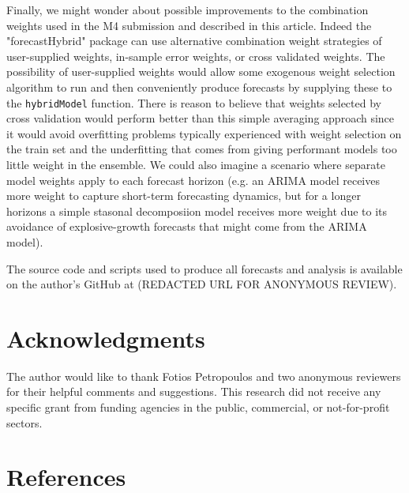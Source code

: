 \documentclass[11pt,3p,review,authoryear]{elsarticle}
\begin{document}
Finally, we might wonder about possible improvements to the combination weights used in the M4 submission and described in this article. Indeed the "forecastHybrid" package can use alternative combination weight strategies of user-supplied weights, in-sample error weights, or cross validated weights. The possibility of user-supplied weights would allow some exogenous weight selection algorithm to run and then conveniently produce forecasts by supplying these to the \texttt{hybridModel} function. There is reason to believe that weights selected by cross validation would perform better than this simple averaging approach since it would avoid overfitting problems typically experienced with weight selection on the train set and the underfitting that comes from giving performant models too little weight in the ensemble. We could also imagine a scenario where separate model weights apply to each forecast horizon (e.g. an ARIMA model receives more weight to capture short-term forecasting dynamics, but for a longer horizons a simple stasonal decomposiion model receives more weight due to its avoidance of explosive-growth forecasts that might come from the ARIMA model).

The source code and scripts used to produce all forecasts and analysis is available on the author's GitHub at (REDACTED URL FOR ANONYMOUS REVIEW).

\section*{Acknowledgments}

The author would like to thank Fotios Petropoulos and two anonymous reviewers for their helpful comments and suggestions. This research did not receive any specific grant from funding agencies in the public, commercial, or not-for-profit sectors.


\section{References}

\end{document}
